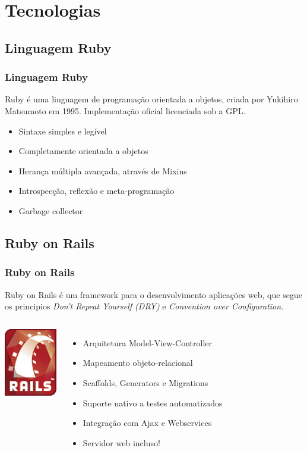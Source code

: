 \documentclass[11pt]{beamer}
\def\gap{\vspace{0.1in}}
\begin{document}
\section{Tecnologias}


	\subsection{Linguagem Ruby}
	\begin{frame}
		\frametitle{Linguagem Ruby}
		Ruby é uma linguagem de programação orientada a objetos, criada por
		Yukihiro Matsumoto em 1995. Implementação oficial licenciada sob a GPL.

		\gap
		\begin{itemize}
			\item Sintaxe simples e legível
			\item Completamente orientada a objetos
			\item Herança múltipla avançada, através de Mixins
			\item Introspecção, reflexão e meta-programação
			\item Garbage collector
		\end{itemize}
	\end{frame}


	\subsection{Ruby on Rails}
	\begin{frame}
		\frametitle{Ruby on Rails}
		Ruby on Rails é um framework para o desenvolvimento aplicações web, que
		segue os principios \emph{Don't Repeat Yourself (DRY)} e
		\emph{Convention over Configuration}.

		\gap
		\begin{columns}[c] 
		\column{1.0in}
			\begin{center}
				\includegraphics[width=0.60 in]{rails.png}
			\end{center}
		\column{5.5in}
			\begin{itemize}
				\item Arquitetura Model-View-Controller
				\item Mapeamento objeto-relacional
				\item Scaffolds, Generators e Migrations
				\item Suporte nativo a testes automatizados
				\item Integração com Ajax e Webservices
				\item Servidor web incluso!
			\end{itemize}
		\end{columns}
	\end{frame}
\end{document}
